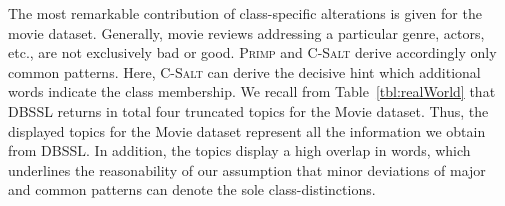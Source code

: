 The most remarkable contribution of class-specific alterations is given for the movie dataset. Generally, movie reviews addressing a particular genre, actors, etc., are not exclusively bad or good. \textsc{Primp} and \textsc{C-Salt} derive accordingly only common patterns. Here, \textsc{C-Salt} can derive the decisive hint which additional words indicate the class membership. We recall from Table~\ref{tbl:realWorld} that \textsc{DBSSL} returns in total four truncated topics for the Movie dataset. Thus, the displayed topics for the Movie dataset represent all the information we obtain from \textsc{DBSSL}. In addition, the topics display a high overlap in words, which underlines the reasonability of our assumption that minor deviations of major and common patterns can denote the sole class-distinctions.  
